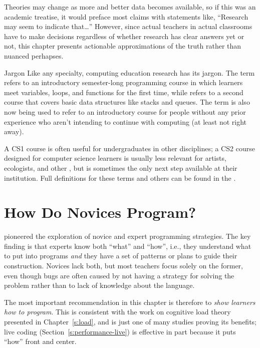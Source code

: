 Theories may change as more and better data becomes available, so if
this was an academic treatise, it would preface most claims with
statements like, ``Research may seem to indicate that{\ldots}''
However, since actual teachers in actual classrooms have to make
decisions regardless of whether research has clear answers yet or not,
this chapter presents actionable approximations of the truth rather than
nuanced perhapses.

\begin{aside}{Jargon}
  Like any specialty, computing education research has its jargon. The
  term  refers to an introductory semester-long
  programming course in which learners meet variables, loops, and
  functions for the first time, while  refers to
  a second course that covers basic data structures like stacks and
  queues. The term  is also now being used to
  refer to an introductory course for people without any prior
  experience who aren't intending to continue with computing (at least
  not right away).

  A CS1 course is often useful for undergraduates in other
  disciplines; a CS2 course designed for computer science learners is
  usually less relevant for artists, ecologists, and other , but is sometimes the only next
  step available at their institution. Full definitions for these
  terms and others can be found in the .
\end{aside}

\section{How Do Novices Program?}\label{s:pck-programming}

\cite{Solo1984,Solo1986} pioneered the exploration of novice and
expert programming strategies. The key finding is that experts know both
``what'' and ``how'', i.e., they understand what to put into programs \emph{and}
they have a set of patterns or plans to guide their construction.
Novices lack both, but most teachers focus solely on the former, even
though bugs are often caused by not having a strategy for solving the
problem rather than to lack of knowledge about the language.

The most important recommendation in this chapter is therefore to \emph{show
learners how to program}. This is consistent with the work on cognitive
load theory presented in Chapter~\ref{s:load}, and \cite{Mull2007b} is
just one of many studies proving its benefits; live coding
(Section~\ref{s:performance-live}) is effective in part because it puts
``how'' front and center.

